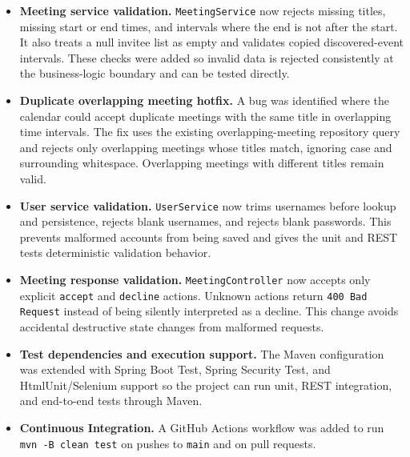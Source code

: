 \begin{itemize}
    \item \textbf{Meeting service validation.} \texttt{MeetingService} now rejects missing titles, missing start or end times, and intervals where the end is not after the start. It also treats a null invitee list as empty and validates copied discovered-event intervals. These checks were added so invalid data is rejected consistently at the business-logic boundary and can be tested directly.
    \item \textbf{Duplicate overlapping meeting hotfix.} A bug was identified where the calendar could accept duplicate meetings with the same title in overlapping time intervals. The fix uses the existing overlapping-meeting repository query and rejects only overlapping meetings whose titles match, ignoring case and surrounding whitespace. Overlapping meetings with different titles remain valid.
    \item \textbf{User service validation.} \texttt{UserService} now trims usernames before lookup and persistence, rejects blank usernames, and rejects blank passwords. This prevents malformed accounts from being saved and gives the unit and REST tests deterministic validation behavior.
    \item \textbf{Meeting response validation.} \texttt{MeetingController} now accepts only explicit \texttt{accept} and \texttt{decline} actions. Unknown actions return \texttt{400 Bad Request} instead of being silently interpreted as a decline. This change avoids accidental destructive state changes from malformed requests.
    \item \textbf{Test dependencies and execution support.} The Maven configuration was extended with Spring Boot Test, Spring Security Test, and HtmlUnit/Selenium support so the project can run unit, REST integration, and end-to-end tests through Maven.
    \item \textbf{Continuous Integration.} A GitHub Actions workflow was added to run \texttt{mvn -B clean test} on pushes to \texttt{main} and on pull requests.
\end{itemize}
